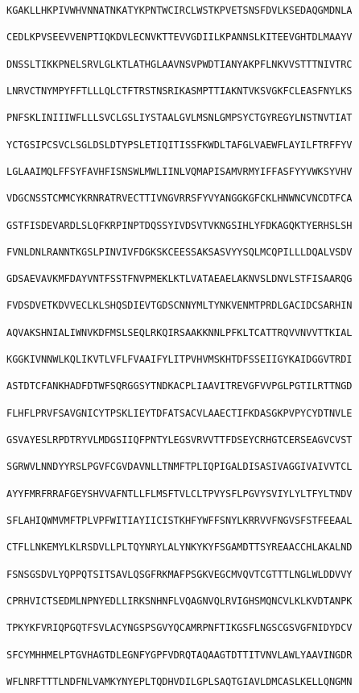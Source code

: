 \documentclass[en,black,10pt,normal]{elegantnote}
\begin{document}
\begin{lstlisting}[frame=single]
KGAKLLHKPIVWHVNNATNKATYKPNTWCIRCLWSTKPVETSNSFDVLKSEDAQGMDNLA

CEDLKPVSEEVVENPTIQKDVLECNVKTTEVVGDIILKPANNSLKITEEVGHTDLMAAYV

DNSSLTIKKPNELSRVLGLKTLATHGLAAVNSVPWDTIANYAKPFLNKVVSTTTNIVTRC

LNRVCTNYMPYFFTLLLQLCTFTRSTNSRIKASMPTTIAKNTVKSVGKFCLEASFNYLKS

PNFSKLINIIIWFLLLSVCLGSLIYSTAALGVLMSNLGMPSYCTGYREGYLNSTNVTIAT

YCTGSIPCSVCLSGLDSLDTYPSLETIQITISSFKWDLTAFGLVAEWFLAYILFTRFFYV

LGLAAIMQLFFSYFAVHFISNSWLMWLIINLVQMAPISAMVRMYIFFASFYYVWKSYVHV

VDGCNSSTCMMCYKRNRATRVECTTIVNGVRRSFYVYANGGKGFCKLHNWNCVNCDTFCA

GSTFISDEVARDLSLQFKRPINPTDQSSYIVDSVTVKNGSIHLYFDKAGQKTYERHSLSH

FVNLDNLRANNTKGSLPINVIVFDGKSKCEESSAKSASVYYSQLMCQPILLLDQALVSDV

GDSAEVAVKMFDAYVNTFSSTFNVPMEKLKTLVATAEAELAKNVSLDNVLSTFISAARQG

FVDSDVETKDVVECLKLSHQSDIEVTGDSCNNYMLTYNKVENMTPRDLGACIDCSARHIN

AQVAKSHNIALIWNVKDFMSLSEQLRKQIRSAAKKNNLPFKLTCATTRQVVNVVTTKIAL

KGGKIVNNWLKQLIKVTLVFLFVAAIFYLITPVHVMSKHTDFSSEIIGYKAIDGGVTRDI

ASTDTCFANKHADFDTWFSQRGGSYTNDKACPLIAAVITREVGFVVPGLPGTILRTTNGD

FLHFLPRVFSAVGNICYTPSKLIEYTDFATSACVLAAECTIFKDASGKPVPYCYDTNVLE

GSVAYESLRPDTRYVLMDGSIIQFPNTYLEGSVRVVTTFDSEYCRHGTCERSEAGVCVST

SGRWVLNNDYYRSLPGVFCGVDAVNLLTNMFTPLIQPIGALDISASIVAGGIVAIVVTCL

AYYFMRFRRAFGEYSHVVAFNTLLFLMSFTVLCLTPVYSFLPGVYSVIYLYLTFYLTNDV

SFLAHIQWMVMFTPLVPFWITIAYIICISTKHFYWFFSNYLKRRVVFNGVSFSTFEEAAL

CTFLLNKEMYLKLRSDVLLPLTQYNRYLALYNKYKYFSGAMDTTSYREAACCHLAKALND

FSNSGSDVLYQPPQTSITSAVLQSGFRKMAFPSGKVEGCMVQVTCGTTTLNGLWLDDVVY

CPRHVICTSEDMLNPNYEDLLIRKSNHNFLVQAGNVQLRVIGHSMQNCVLKLKVDTANPK

TPKYKFVRIQPGQTFSVLACYNGSPSGVYQCAMRPNFTIKGSFLNGSCGSVGFNIDYDCV

SFCYMHHMELPTGVHAGTDLEGNFYGPFVDRQTAQAAGTDTTITVNVLAWLYAAVINGDR

WFLNRFTTTLNDFNLVAMKYNYEPLTQDHVDILGPLSAQTGIAVLDMCASLKELLQNGMN


\end{lstlisting}
\end{document}
